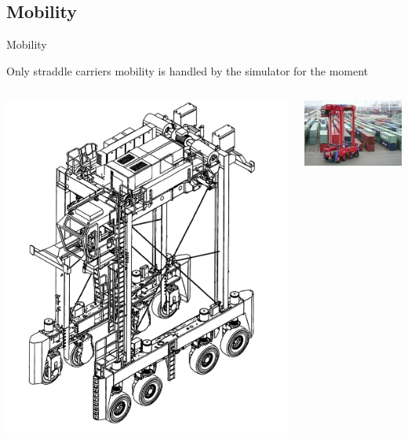 \documentclass{beamer}
\begin{document}
 \subsection*{Mobility}
  \begin{frame}{Mobility}
  
  \begin{center}
  Only straddle carriers mobility is handled by the simulator for the moment
\vspace{0.8cm}

\begin{columns}
    \begin{column}[l]{3.0cm}	
      \includegraphics[height=.25\textheight]{fig/schema_sc.jpg}
    \end{column}
    \begin{column}[c]{4.0cm}	
      \includegraphics[height=.25\textheight]{fig/chariot_cavalier.jpg}

\end{column}
\end{columns}
\end{center}
\end{frame}
\end{document}
